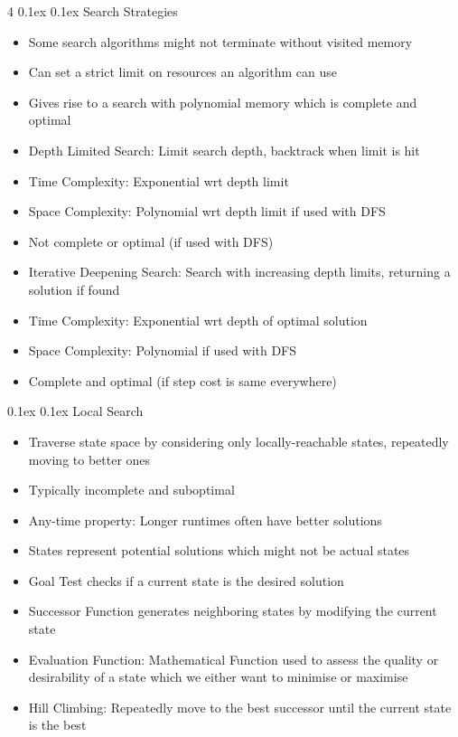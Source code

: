 \documentclass[10pt, landscape]{article}
\makeatletter
\renewcommand{\subsection}{\@startsection{subsection}{2}{0mm}%
  {0.1ex} %
  {0.1ex} %
  {\normalfont\normalsize\bfseries}}
\makeatother
\begin{document}
\begin{multicols*}{4}
\subsection{Search Strategies}
\begin{itemize}
    \item Some search algorithms might not terminate without visited memory
    \item Can set a strict limit on resources an algorithm can use
    \item Gives rise to a search with polynomial memory which is complete and optimal
    \item Depth Limited Search: Limit search depth, backtrack when limit is hit
    \item Time Complexity: Exponential wrt depth limit
    \item Space Complexity: Polynomial wrt depth limit if used with DFS
    \item Not complete or optimal (if used with DFS)
    \item Iterative Deepening Search: Search with increasing depth limits, returning a solution if found
    \item Time Complexity: Exponential wrt depth of optimal solution
    \item Space Complexity: Polynomial if used with DFS
    \item Complete and optimal (if step cost is same everywhere)
\end{itemize}

\subsection{Local Search}
\begin{itemize}
    \item Traverse state space by considering only locally-reachable states, repeatedly moving to better ones
    \item Typically incomplete and suboptimal
    \item Any-time property: Longer runtimes often have better solutions
    \item States represent potential solutions which might not be actual states
    \item Goal Test checks if a current state is the desired solution
    \item Successor Function generates neighboring states by modifying the current state
    \item Evaluation Function: Mathematical Function used to assess the quality or desirability of a state which we either want to minimise or maximise
    \item Hill Climbing: Repeatedly move to the best successor until the current state is the best
\end{itemize}


\end{multicols*}
\end{document}
